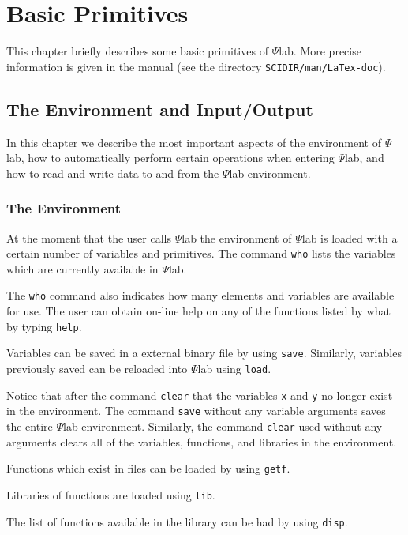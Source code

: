 \chapter{Basic Primitives}
\label{ch5}
This chapter briefly describes some basic primitives of $\Psi$lab.
More precise information is given in the manual 
(see the directory {\tt SCIDIR/man/LaTex-doc}).
\section{The Environment and Input/Output}
	In this chapter we describe the most important aspects
of the environment of $\Psi$lab, how to automatically
perform certain operations when entering $\Psi$lab,
and how to read and write data
to and from the $\Psi$lab environment.

\subsection{The Environment}
\label{s5.1}

	At the moment that the user calls $\Psi$lab the environment
of $\Psi$lab is loaded with a certain number of variables and primitives.
The command {\tt who} lists the variables 
which are currently available in $\Psi$lab.  

The {\tt who} command also indicates how many elements and variables
are available for use.  The user can obtain on-line help on any of 
the functions listed by what by typing {\tt help}.

	Variables can be saved in a external binary
file by using {\tt save}.  
Similarly, variables previously saved can be
reloaded into $\Psi$lab using {\tt load}.

Notice that after the command {\tt clear} 
that the variables {\tt x} and
{\tt y} no longer exist in the environment.  
The command {\tt save} without any variable arguments saves the entire 
$\Psi$lab environment.  Similarly,
the command {\tt clear} used
without any arguments clears all of the variables, functions, and libraries
in the environment.

	Functions which exist in files can be loaded by using 
{\tt getf}.  

Libraries of functions are loaded
using {\tt lib}.  

The list of functions available in the library can be had by using {\tt disp}.

